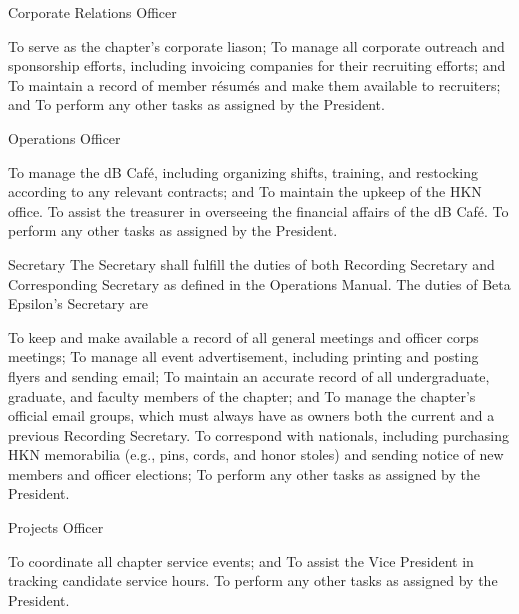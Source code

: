 \begin{enumsubsection}
\begin{enumsubsubsection}
\end{enumsubsubsection}

\item{Corporate Relations Officer}
\begin{enumsubsubsection}
\itemnotoc To serve as the chapter's corporate liason;
\itemnotoc To manage all corporate outreach and sponsorship efforts, including invoicing companies for their recruiting efforts; and
\itemnotoc To maintain a record of member r\'{e}sum\'{e}s and make them available to recruiters; and
\itemnotoc To perform any other tasks as assigned by the President.

\end{enumsubsubsection}

\item{Operations Officer}
\begin{enumsubsubsection}
\itemnotoc To manage the dB Caf\'{e}, including organizing shifts, training, and restocking according to any relevant contracts; and
\itemnotoc To maintain the upkeep of the HKN office.
\itemnotoc To assist the treasurer in overseeing the financial affairs of the dB Caf\'{e}.
\itemnotoc To perform any other tasks as assigned by the President.
\end{enumsubsubsection}

\item{Secretary}
The Secretary shall fulfill the duties of both Recording Secretary and Corresponding Secretary as defined in the \hkn Operations Manual. The duties of Beta Epsilon's Secretary are
\begin{enumsubsubsection}
\itemnotoc To keep and make available a record of all general meetings and officer corps meetings;
\itemnotoc To manage all event advertisement, including printing and posting flyers and sending email;
\itemnotoc To maintain an accurate record of all undergraduate, graduate, and faculty members of the chapter; and
\itemnotoc To manage the chapter's official email groups, which must always have as owners both the current and a previous Recording Secretary.
\itemnotoc To correspond with \hkn nationals, including purchasing HKN memorabilia (e.g., pins, cords, and honor stoles) and sending notice of new members and officer elections;
\itemnotoc To perform any other tasks as assigned by the President.
\end{enumsubsubsection}

\item{Projects Officer}
\begin{enumsubsubsection}
\itemnotoc To coordinate all chapter service events; and
\itemnotoc To assist the Vice President in tracking candidate service hours.
\itemnotoc To perform any other tasks as assigned by the President.
\end{enumsubsubsection}


\end{enumsubsection}
